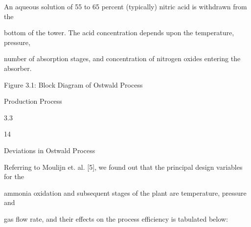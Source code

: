 \documentclass[a4paper,portrait,12pt]{article}
\begin{document}
\begin{flushleft}
An aqueous solution of 55 to 65 percent (typically) nitric acid is withdrawn from the
\end{flushleft}


\begin{flushleft}
bottom of the tower. The acid concentration depends upon the temperature, pressure,
\end{flushleft}


\begin{flushleft}
number of absorption stages, and concentration of nitrogen oxides entering the absorber.
\end{flushleft}





\begin{flushleft}
Figure 3.1: Block Diagram of Ostwald Process
\end{flushleft}





\begin{flushleft}
\newpage
Production Process
\end{flushleft}





3.3





14





\begin{flushleft}
Deviations in Ostwald Process
\end{flushleft}





\begin{flushleft}
Referring to Moulijn et. al. [5], we found out that the principal design variables for the
\end{flushleft}


\begin{flushleft}
ammonia oxidation and subsequent stages of the plant are temperature, pressure and
\end{flushleft}


\begin{flushleft}
gas flow rate, and their effects on the process efficiency is tabulated below:
\end{flushleft}
\end{document}
